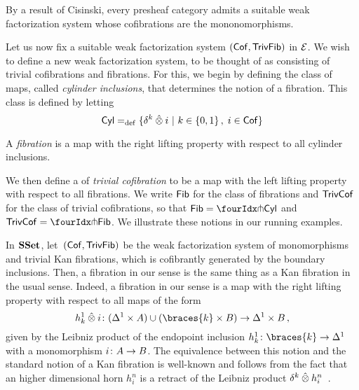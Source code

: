 \documentclass[reqno,10pt,a4paper,oneside,draft]{amsart}
\begin{document}
\begin{example} \label{thm:generation-presheaf-cisinski} By a result of Cisinski, every presheaf category admits a suitable weak factorization
system whose cofibrations are the mononomorphisms. 
\end{example} 


Let us now fix a suitable weak factorization system $(\mathsf{Cof},\mathsf{TrivFib})$ in $\mathcal{E}$.
We wish to define a new weak factorization system, to be thought of as consisting of trivial cofibrations and fibrations. For this, we begin by defining the class of maps, called \emph{cylinder inclusions}, that determines the notion of a fibration. This class is defined by letting
\begin{equation}
\label{equ:cylinc}
\mathsf{Cyl} =_{\operatorname{def}} \{ \delta^k \mathbin{\hat{\otimes}} i \ | \ k \in \{ 0, 1 \} \, , \; i \in \mathsf{Cof} \}
\end{equation}

\begin{definition} \label{non-alg-fib} A \emph{fibration} is a map with the right lifting property with respect to all cylinder inclusions.
\end{definition} 


We then define a of \emph{trivial cofibration} to be a map with the left lifting property with respect to all fibrations.
We write $\mathsf{Fib}$ for the class of fibrations and $\mathsf{TrivCof}$ for the class of trivial cofibrations, so that 
$\Fib = \liftr{\Cyl}$ and $\TrivCof = \liftl{\Fib}$.  We illustrate these notions in our running examples.

\begin{example} \label{thm:fib-is-kan}
In $\mathbf{SSet}$, let~$(\mathsf{Cof}, \mathsf{TrivFib})$  be the weak factorization system of monomorphisms and trivial Kan fibrations, which is cofibrantly generated
by the boundary inclusions. Then, a fibration in our sense  is the same thing as a Kan fibration in the usual sense. 
Indeed, a fibration in our sense is a map with the right lifting property with respect to all maps of the form
\[
h_k^1 \hatotimes i \co   (\Delta^1 \times A) \cup (\braces{k} \times B) \to  \Delta^1 \times B \, ,
\]
given by the Leibniz product of the endopoint inclusion $h_k^1 \co \braces{k} \to \Delta^1$ with a monomorphism $i \colon A \to B$. The equivalence between this notion and the standard notion of a Kan fibration is well-known and follows from the fact that an higher dimensional horn $h_i^n$ is a retract of the Leibniz product $\delta^k \mathbin{\hat{\otimes}} h_i^n$~\cite[Chap.~IV, Sec.~2]{gabriel-zisman:calculus-of-fractions}.
\end{example}
\end{document}

